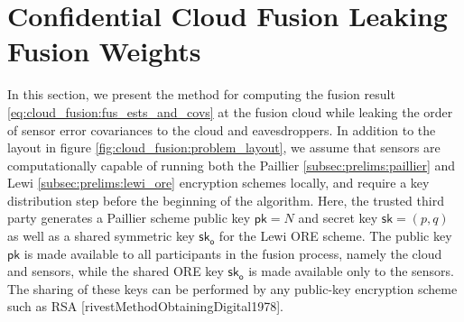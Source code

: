 % 
%                                                                               
%                                                                               
%                                                                               
% 

\section{Confidential Cloud Fusion Leaking Fusion Weights}\label{sec:cloud_fusion:fusion_with_leakage}
In this section, we present the method for computing the fusion result \eqref{eq:cloud_fusion:fus_ests_and_covs} at the fusion cloud while leaking the order of sensor error covariances to the cloud and eavesdroppers. In addition to the layout in figure \ref{fig:cloud_fusion:problem_layout}, we assume that sensors are computationally capable of running both the Paillier \ref{subsec:prelims:paillier} and Lewi \ref{subsec:prelims:lewi_ore} encryption schemes locally, and require a key distribution step before the beginning of the algorithm. Here, the trusted third party generates a Paillier scheme public key $\mathsf{pk}=N$ and secret key $\mathsf{sk}=(p,q)$ as well as a shared symmetric key $\mathsf{sk}_{\mathsf{o}}$ for the Lewi ORE scheme. The public key $\mathsf{pk}$ is made available to all participants in the fusion process, namely the cloud and sensors, while the shared ORE key $\mathsf{sk}_{\mathsf{o}}$ is made available only to the sensors. The sharing of these keys can be performed by any public-key encryption scheme such as RSA [rivestMethodObtainingDigital1978].

% 
% 

